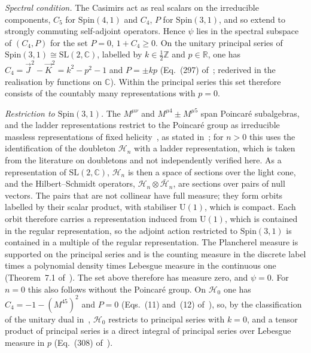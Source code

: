 \emph{Spectral condition.} The Casimirs act as real scalars on the irreducible components, \(C_5\) for \(\mathrm{Spin}(4,1)\) and \(C_4\), \(P\) for \(\mathrm{Spin}(3,1)\), and so extend to strongly commuting self-adjoint operators. Hence \(\psi\) lies in the spectral subspace of \((C_4,P)\) for the set \(P=0\), \(1+C_4\ge0\). On the unitary principal series of \(\mathrm{Spin}(3,1)\cong\mathrm{SL}(2,\mathbb C)\), labelled by \(k\in\tfrac12\mathbb Z\) and \(p\in\mathbb R\), one has \(C_4=\vec J^2-\vec K^2=k^2-p^2-1\) and \(P=\pm kp\) (Eq.~(297) of~\cite{MartinDussaud2019}; rederived in the realisation by functions on \(\mathbb C\)). Within the principal series this set therefore consists of the countably many representations with \(p=0\).

\emph{Restriction to \(\mathrm{Spin}(3,1)\).} The \(M^{\mu\nu}\) and \(M^{\mu4}\pm M^{\mu5}\) span Poincar\'e subalgebras, and the ladder representations restrict to the Poincar\'e group as irreducible massless representations of fixed helicity~\cite{MackTodorov1969}, as stated in~\cite{Todorov2019}; for \(n>0\) this uses the identification of the doubleton \(\mathcal H_n\) with a ladder representation, which is taken from the literature on doubletons and not independently verified here. As a representation of \(\mathrm{SL}(2,\mathbb C)\), \(\mathcal H_n\) is then a space of sections over the light cone, and the Hilbert--Schmidt operators, \(\mathcal H_n\otimes\bar{\mathcal H}_n\), are sections over pairs of null vectors. The pairs that are not collinear have full measure; they form orbits labelled by their scalar product, with stabiliser \(\mathrm U(1)\), which is compact. Each orbit therefore carries a representation induced from \(\mathrm U(1)\), which is contained in the regular representation, so the adjoint action restricted to \(\mathrm{Spin}(3,1)\) is contained in a multiple of the regular representation. The Plancherel measure is supported on the principal series and is the counting measure in the discrete label times a polynomial density times Lebesgue measure in the continuous one (Theorem~7.1 of~\cite{FioresiYuncken2024}). The set above therefore has measure zero, and \(\psi=0\). For \(n=0\) this also follows without the Poincar\'e group. On \(\mathcal H_0\) one has \(C_4=-1-(M^{45})^2\) and \(P=0\) (Eqs.~(11) and~(12) of~\cite{MantaSteinacker2025}), so, by the classification of the unitary dual in~\cite{MartinDussaud2019}, \(\mathcal H_0\) restricts to principal series with \(k=0\), and a tensor product of principal series is a direct integral of principal series over Lebesgue measure in \(p\) (Eq.~(308) of~\cite{MartinDussaud2019}).

